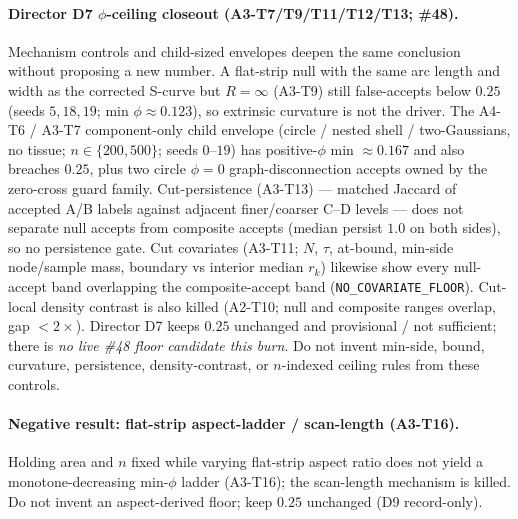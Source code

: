 \documentclass[11pt]{article}
\begin{document}
\paragraph{Director D7 $\phi$-ceiling closeout (A3-T7/T9/T11/T12/T13; \#48).}
\label{par:si-phi-ceiling-d7}
Mechanism controls and child-sized envelopes deepen the same
conclusion without proposing a new number. A flat-strip null with the
same arc length and width as the corrected S-curve but
$R{=}\infty$ (A3-T9) still false-accepts below $0.25$ (seeds
$5,18,19$; min $\phi\approx 0.123$), so extrinsic curvature is not the
driver. The A4-T6 / A3-T7 component-only child envelope (circle /
nested shell / two-Gaussians, no tissue; $n\in\{200,500\}$; seeds
$0$--$19$) has positive-$\phi$ min $\approx 0.167$ and also breaches
$0.25$, plus two circle $\phi{=}0$ graph-disconnection accepts owned
by the zero-cross guard family. Cut-persistence (A3-T13) --- matched
Jaccard of accepted A/B labels against adjacent finer/coarser C--D
levels --- does not separate null accepts from composite accepts
(median persist $1.0$ on both sides), so no persistence gate.
Cut covariates (A3-T11; $N$, $\tau$, at-bound, min-side node/sample
mass, boundary vs interior median $r_k$) likewise show every
null-accept band overlapping the composite-accept band
(\texttt{NO\_COVARIATE\_FLOOR}). Cut-local density contrast is also
killed (A2-T10; null and composite ranges overlap, gap ${<}2\times$).
Director D7 keeps $0.25$ unchanged and provisional / not sufficient;
there is \emph{no live \#48 floor candidate this burn}. Do not invent
min-side, bound, curvature, persistence, density-contrast, or
$n$-indexed ceiling rules from these controls.

\paragraph{Negative result: flat-strip aspect-ladder / scan-length (A3-T16).}
\label{par:si-aspect-ladder-kill}
Holding area and $n$ fixed while varying flat-strip aspect ratio does not
yield a monotone-decreasing min-$\phi$ ladder (A3-T16); the scan-length
mechanism is killed. Do not invent an aspect-derived floor; keep $0.25$
unchanged (D9 record-only).
\end{document}
